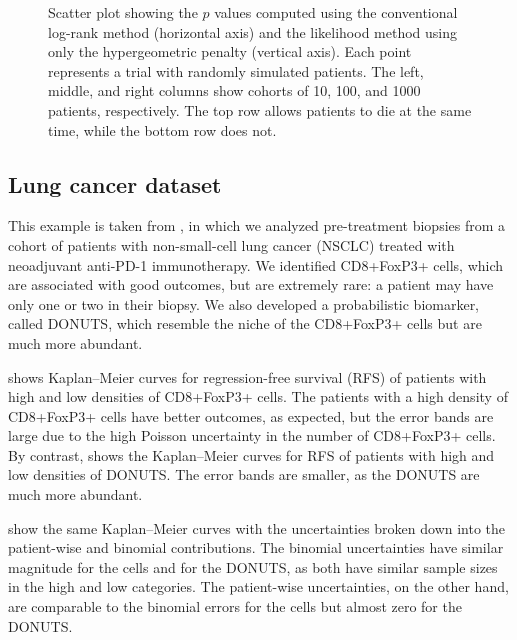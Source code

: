 \documentclass[article]{jss}
\newcommand{\KM}{Kaplan--Meier} %
\begin{document}
\begin{figure}
\begin{subfigure}[t]{0.32\textwidth}
  \caption{\label{fig:compare-p-value-1000-patients-no-ties}}
\end{subfigure}
\caption{\label{fig:compare-p-value} Scatter plot showing the \(p\) values computed using the conventional log-rank method (horizontal axis) and the likelihood method using only the hypergeometric penalty (vertical axis).  Each point represents a trial with randomly simulated patients.  The left, middle, and right columns show cohorts of 10, 100, and 1000 patients, respectively.  The top row allows patients to die at the same time, while the bottom row does not.}
\end{figure}

\subsection{Lung cancer dataset}

This example is taken from \citet{DONUTS}, in which we analyzed pre-treatment biopsies from a cohort of patients with non-small-cell lung cancer (NSCLC) treated with neoadjuvant anti-PD-1 immunotherapy.  We identified CD8+FoxP3+ cells, which are associated with good outcomes, but are extremely rare: a patient may have only one or two in their biopsy.  We also developed a probabilistic biomarker, called DONUTS, which resemble the niche of the CD8+FoxP3+ cells but are much more abundant.

 shows \KM{} curves for regression-free survival (RFS) of patients with high and low densities of CD8+FoxP3+ cells.  The patients with a high density of CD8+FoxP3+ cells have better outcomes, as expected, but the error bands are large due to the high Poisson uncertainty in the number of CD8+FoxP3+ cells.  By contrast,  shows the \KM{} curves for RFS of patients with high and low densities of DONUTS\@.  The error bands are smaller, as the DONUTS are much more abundant.

 show the same \KM{} curves with the uncertainties broken down into the patient-wise and binomial contributions.  The binomial uncertainties have similar magnitude for the cells and for the DONUTS, as both have similar sample sizes in the high and low categories.  The patient-wise uncertainties, on the other hand, are comparable to the binomial errors for the cells but almost zero for the DONUTS\@.
\end{document}
